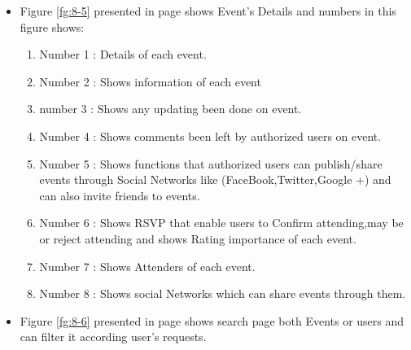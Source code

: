 \documentclass[12pt,a4paper,class,twoside,openany]{report}
\begin{document}
{\begin{itemize}
\begin{enumerate}
\item Number 1 : The profile Page.
\item Number 2 : Shows information about authorized user.
\item Number 3 : Shows user's friends and button which can use to invite friends to any events.
\item Number 4 : Shows all events which user has attended it and that s/he has created them.
\item Number 5 : Shows events that was created by  authorized users .
\item Number 6 : Shows events that was attended by authorized users.
\end{enumerate}
\item Figure \ref{fg:8-5} presented in page \pageref{fg:8-5} shows Event's Details and  numbers in this figure shows:
\begin{enumerate}
\item Number 1 : Details of each event.
\item Number 2 : Shows information of each event
\item number 3 : Shows any updating been done on event.
\item Number 4 : Shows comments been left by authorized users on event.
\item Number 5 : Shows functions that authorized users can publish/share events through Social Networks like (FaceBook,Twitter,Google +) and can also invite friends to events. 
\item Number 6 : Shows RSVP that enable users to Confirm attending,may be or reject attending and shows Rating importance of each event.
\item Number 7 : Shows Attenders of each event.
\item Number 8 : Shows social Networks which can share events through them.
\end{enumerate}
\item Figure \ref{fg:8-6} presented in page \pageref{fg:8-6} shows search page both Events or users and can filter it according user's requests.
\end{itemize}
\begin{figure}
\begin{center}

\end{center}
\end{figure}}
\end{document}
